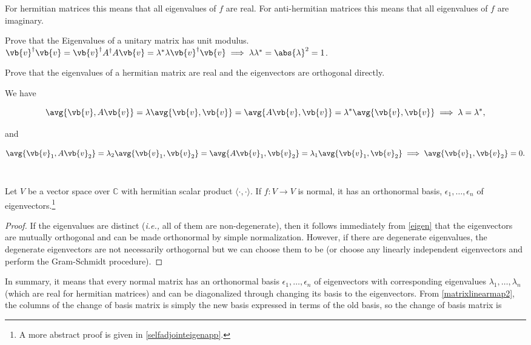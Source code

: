 \documentclass[a4paper,12pt]{report}
\begin{document}
For hermitian matrices this means that all eigenvalues of \(f\) are real. For anti-hermitian matrices this means that all eigenvalues of \(f\) are imaginary.

{Prove that the Eigenvalues of a unitary matrix has unit modulus.}
{\(\vb{v}^{\dagger}\vb{v}  = {\vb{v} }^{\dagger}A^{\dagger} A \vb{v} = \lambda ^*\lambda \vb{v}^{\dagger} \vb{v} \implies \lambda \lambda ^* = \abs{\lambda }^2= 1 \). } 


{Prove that the eigenvalues of a hermitian matrix are real and the eigenvectors are orthogonal directly.}
{We have 

\begin{equation}
    \avg{\vb{v} , A \vb{v}} = \lambda \avg{\vb{v},\vb{v}  } = \avg{A \vb{v}, \vb{v}  } = \lambda ^*\avg{\vb{v},\vb{v}  } \implies \lambda = \lambda ^*,
\end{equation}

and 

\begin{equation}
    \avg{\vb{v}_{1}, A \vb{v}_{2}  } = \lambda _{2} \avg{\vb{v}_{1} ,\vb{v}_{2}   } = \avg{A \vb{v}_{1}, \vb{v}_{2}    }  = \lambda _{1} \avg{\vb{v}_{1}, \vb{v}_{2}    } \implies \avg{\vb{v}_{1}, \vb{v}_{2}    } = 0.
\end{equation}
~
} 


\begin{theorem} \label{selfadjointeigen} 
    Let $V$ be a vector space over $\mathbb{C}$ with hermitian scalar product $\langle \cdot, \cdot \rangle$. If $f : V \to V$ is normal, it has an orthonormal basis, $\epsilon_1, \ldots, \epsilon_n$ of eigenvectors.\footnote{A more abstract proof is given in \cref{selfadjointeigenapp}.} 
\end{theorem}

\begin{proof}
If the eigenvalues are distinct (\textit{i.e.,} all of them are non-degenerate), then it follows immediately from \cref{eigen} that the eigenvectors are mutually orthogonal and can be made orthonormal by simple normalization. However, if there are degenerate eigenvalues, the degenerate eigenvectors are not necessarily orthogornal but we can choose them to be (or choose any linearly independent eigenvectors and perform the Gram-Schmidt procedure).
\end{proof}

    
In summary, it means that every normal matrix has an orthonormal basis $\epsilon_1, \ldots, \epsilon_n$ of eigenvectors with corresponding eigenvalues $\lambda_1, \ldots, \lambda_n$ (which are real for hermitian matrices) and can be diagonalized through changing its basis to the eigenvectors. From \cref{matrixlinearmap2}, the columns of the change of basis matrix is simply the new basis expressed in terms of the old basis, so the change of basis matrix is
\end{document}

